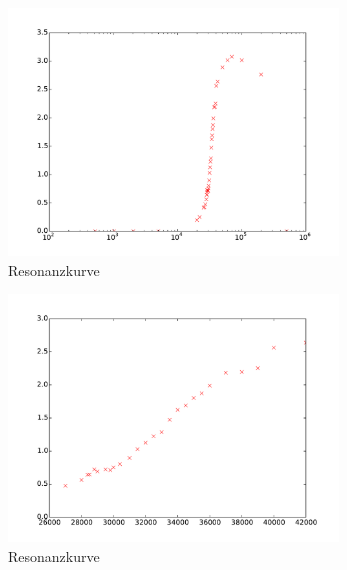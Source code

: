\begin{figure}
  \centering
  \includegraphics[width=0.78\textwidth]{phasenverschiebung.pdf}
  \caption{Resonanzkurve}
  \label{fig:phasenverschiebung}
\end{figure}
\begin{figure}
  \centering
  \includegraphics[width=0.78\textwidth]{linphasenverschiebung.pdf}
  \caption{Resonanzkurve}
  \label{fig:linphasenverschiebung}
\end{figure}

